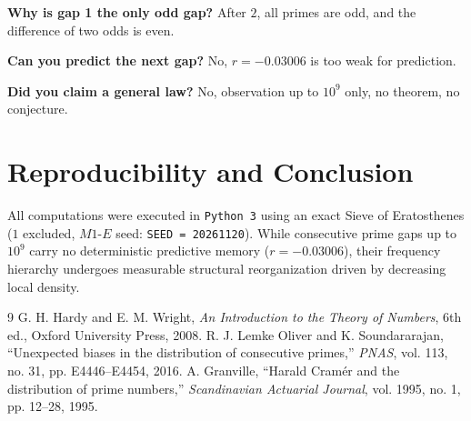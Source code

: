 \documentclass[12pt,a4paper]{article}
\begin{document}
\textbf{Why is gap 1 the only odd gap?} After $2$, all primes are odd, and the difference of two odds is even.

\textbf{Can you predict the next gap?} No, $r = -0.03006$ is too weak for prediction.

\textbf{Did you claim a general law?} No, observation up to $10^9$ only, no theorem, no conjecture.

\section{Reproducibility and Conclusion}
All computations were executed in \texttt{Python 3} using an exact Sieve of Eratosthenes ($1$ excluded, $M1$-$E$ seed: \texttt{SEED = 20261120}). While consecutive prime gaps up to $10^9$ carry no deterministic predictive memory ($r = -0.03006$), their frequency hierarchy undergoes measurable structural reorganization driven by decreasing local density.

\begin{thebibliography}{9}
 G. H. Hardy and E. M. Wright, \textit{An Introduction to the Theory of Numbers}, 6th ed., Oxford University Press, 2008.
 R. J. Lemke Oliver and K. Soundararajan, ``Unexpected biases in the distribution of consecutive primes,'' \textit{PNAS}, vol. 113, no. 31, pp. E4446--E4454, 2016.
 A. Granville, ``Harald Cram\'er and the distribution of prime numbers,'' \textit{Scandinavian Actuarial Journal}, vol. 1995, no. 1, pp. 12--28, 1995.
\end{thebibliography}
\end{document}
